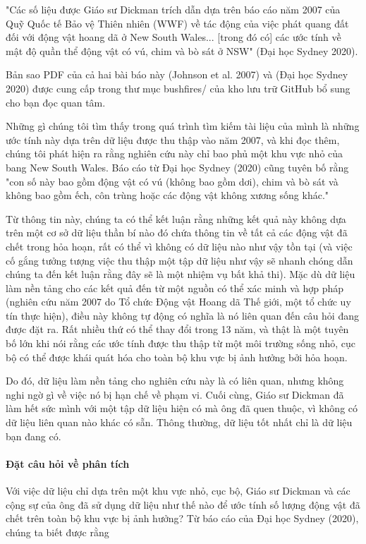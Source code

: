 "Các số liệu được Giáo sư Dickman trích dẫn dựa trên báo cáo năm 2007 của Quỹ Quốc tế Bảo vệ Thiên nhiên (WWF) về tác động của việc phát quang đất đối với động vật hoang dã ở New South Wales... [trong đó có] các ước tính về mật độ quần thể động vật có vú, chim và bò sát ở NSW" (Đại học Sydney 2020).

Bản sao PDF của cả hai bài báo này (Johnson et al. 2007) và (Đại học Sydney 2020) được cung cấp trong thư mục bushfires/ của kho lưu trữ GitHub bổ sung cho bạn đọc quan tâm.

Những gì chúng tôi tìm thấy trong quá trình tìm kiếm tài liệu của mình là những ước tính này dựa trên dữ liệu được thu thập vào năm 2007, và khi đọc thêm, chúng tôi phát hiện ra rằng nghiên cứu này chỉ bao phủ một khu vực nhỏ của bang New South Wales. Báo cáo từ Đại học Sydney (2020) cũng tuyên bố rằng "con số này bao gồm động vật có vú (không bao gồm dơi), chim và bò sát và không bao gồm ếch, côn trùng hoặc các động vật không xương sống khác."

Từ thông tin này, chúng ta có thể kết luận rằng những kết quả này không dựa trên một cơ sở dữ liệu thần bí nào đó chứa thông tin về tất cả các động vật đã chết trong hỏa hoạn, rất có thể vì không có dữ liệu nào như vậy tồn tại (và việc cố gắng tưởng tượng việc thu thập một tập dữ liệu như vậy sẽ nhanh chóng dẫn chúng ta đến kết luận rằng đây sẽ là một nhiệm vụ bất khả thi). Mặc dù dữ liệu làm nền tảng cho các kết quả đến từ một nguồn có thể xác minh và hợp pháp (nghiên cứu năm 2007 do Tổ chức Động vật Hoang dã Thế giới, một tổ chức uy tín thực hiện), điều này không tự động có nghĩa là nó liên quan đến câu hỏi đang được đặt ra. Rất nhiều thứ có thể thay đổi trong 13 năm, và thật là một tuyên bố lớn khi nói rằng các ước tính được thu thập từ một môi trường sống nhỏ, cục bộ có thể được khái quát hóa cho toàn bộ khu vực bị ảnh hưởng bởi hỏa hoạn.

Do đó, dữ liệu làm nền tảng cho nghiên cứu này là có liên quan, nhưng không nghi ngờ gì về việc nó bị hạn chế về phạm vi. Cuối cùng, Giáo sư Dickman đã làm hết sức mình với một tập dữ liệu hiện có mà ông đã quen thuộc, vì không có dữ liệu liên quan nào khác có sẵn. Thông thường, dữ liệu tốt nhất chỉ là dữ liệu bạn đang có.

\paragraph{Đặt câu hỏi về phân tích}

Với việc dữ liệu chỉ dựa trên một khu vực nhỏ, cục bộ, Giáo sư Dickman và các cộng sự của ông đã sử dụng dữ liệu như thế nào để ước tính số lượng động vật đã chết trên toàn bộ khu vực bị ảnh hưởng? Từ báo cáo của Đại học Sydney (2020), chúng ta biết được rằng

